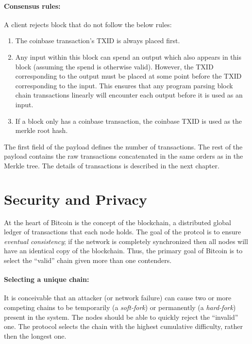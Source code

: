 \documentclass[]{report}   %
\begin{document}
\paragraph{Consensus rules:} A client rejects block that do not follow the below rules:
\begin{enumerate}
	\item The coinbase transaction's TXID is always placed first.
	\item Any input within this block can spend an output which also appears in this block (assuming the spend is otherwise valid). However, the TXID corresponding to the output must be placed at some point before the TXID corresponding to the input. This ensures that any program parsing block chain transactions linearly will encounter each output before it is used as an input.
\item If a block only has a coinbase transaction, the coinbase TXID is used as the merkle root hash.
\end{enumerate}

The first field of the payload defines the number of transactions. The rest of the payload contains the raw transactions concatenated in the same orders as in the Merkle tree.
The details of transactions is described in the next chapter.





\section{Security and Privacy} 

At the heart of Bitcoin is the concept of the blockchain, a distributed global ledger of transactions that each node holds. The goal of the protcol is to ensure {\em eventual consistency}; if the network is completely synchronized then all nodes will have an identical copy of the blockchain. Thus, the primary goal of Bitcoin is to select the ``valid'' chain given more than one contenders. 


\paragraph{Selecting a unique chain:} It is conceivable that an attacker (or network failure) can cause two or more competing chains to be temporarily (a {\em soft-fork}) or permanently (a {\em hard-fork}) present in the system. The nodes should be able to quickly reject the ``invalid'' one. The protocol selects the chain with the highest cumulative difficulty, rather then the longest one. 
\end{document}
